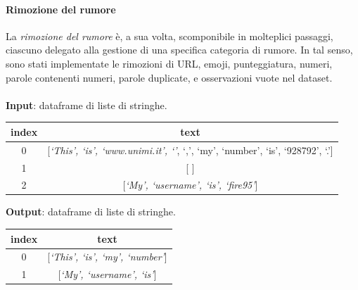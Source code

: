 \documentclass[12pt]{report}
\theoremstyle{definition}
\begin{document}
\paragraph{Rimozione del rumore}
La \textit{rimozione del rumore} è, a sua volta, scomponibile in molteplici passaggi, ciascuno delegato alla gestione di una specifica categoria di rumore.
In tal senso, sono stati implementate le rimozioni di URL, emoji, punteggiatura, numeri, parole contenenti numeri, parole duplicate, e osservazioni vuote nel dataset. 
\\
\\
\textbf{Input}: dataframe di liste di stringhe.
\begin{center}
    \begin{tabular}{|c|c|}
    \hline
    \textbf{index} & \textbf{text} \\
    \hline
         0 & [\textit{`This', `is', `www.unimi.it', `\smiley{}'}, `,', `my', `number', `is', `928792', `.']\\
         1 & [\textit{ }] \\
         2 & [\textit{`My', `username', `is', `fire95'}] \\
    \hline
    \end{tabular}
\end{center}
\textbf{Output}: dataframe di liste di stringhe.
\begin{center}
    \begin{tabular}{|c|c|}
    \hline
    \textbf{index} & \textbf{text} \\
    \hline
         0 & [\textit{`This', `is', `my', `number'}]\\
         1 & [\textit{`My', `username', `is'}] \\
    \hline
    \end{tabular}
\end{center}
\end{document}
